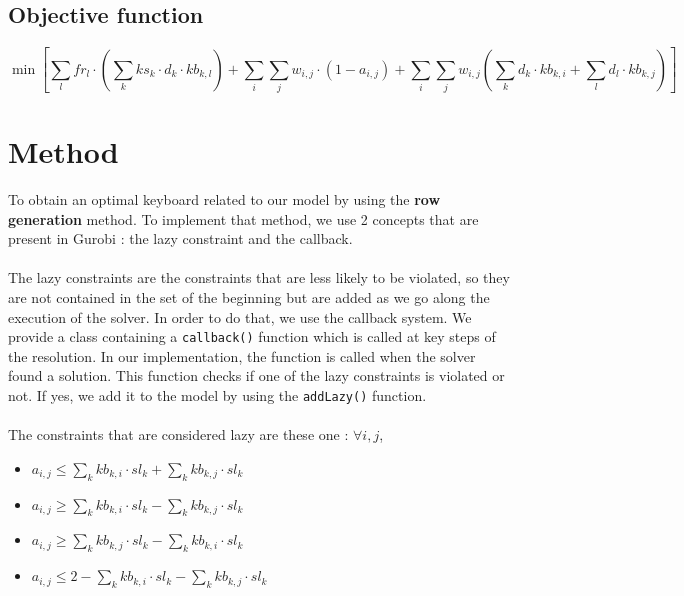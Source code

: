 \documentclass[a4paper,titlepage]{article}
\begin{document}
	\subsection{Objective function}

\[
	\min \left[ \sum_l fr_l \cdot \left( \sum_k ks_k \cdot d_k \cdot kb_{k,l}  \right) + \sum_i \sum_j w_{i,j} \cdot \left(1 - a_{i,j}\right) + \sum_i \sum_j w_{i,j} \left( \sum_k d_k \cdot kb_{k,i} + \sum_l d_l \cdot kb_{k,j} \right) \right]
\]



\section{Method}
To obtain an optimal keyboard related to our model by using the \textbf{row generation} method. To implement that method, we use 2 concepts that are present in Gurobi : the lazy constraint and the callback.
\paragraph{}
The lazy constraints are the constraints that are less likely to be violated, so they are not contained in the set of the beginning but are added as we go along the execution of the solver. In order to do that, we use the callback system. We provide a class containing a \texttt{callback()} function which is called at key steps of the resolution.
In our implementation, the function is called when the solver found a solution. This function checks if one of the lazy constraints is violated or not. If yes, we add it to the model by using the \texttt{addLazy()} function.
\paragraph{}
The constraints that are considered lazy are these one : $\forall i,j$,
\begin{itemize}
	\item $a_{i,j} \leq \sum_k kb_{k,i} \cdot sl_k + \sum_k kb_{k,j} \cdot sl_k$

	\item $a_{i,j} \geq \sum_k kb_{k,i} \cdot sl_k - \sum_k kb_{k,j} \cdot sl_k$

	\item $a_{i,j} \geq \sum_k kb_{k,j} \cdot sl_k - \sum_k kb_{k,i} \cdot sl_k$

	\item $a_{i,j} \leq 2 - \sum_k kb_{k,i} \cdot sl_k - \sum_k kb_{k,j} \cdot sl_k$
\end{itemize}
\end{document}
